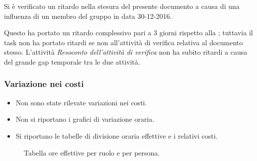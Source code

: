 Si è verificato un ritardo nella stesura del presente documento a causa di una influenza di un membro del gruppo in data 30-12-2016.

Questo ha portato un ritardo complessivo pari a 3 giorni rispetto alla ; tuttavia il task non ha portato ritardi se non all'attività di verifica relativa al documento stesso. L'attività \emph{Resoconto dell'attività di verifica} non ha subito ritardi a causa del grande gap temporale tra le due attività.

\pagebreak
\subsubsection{Variazione nei costi}
\begin{itemize}

\item Non sono state rilevate variazioni nei costi.

\item Non si riportano i grafici di variazione oraria.

\item Si riportano le tabelle di divisione oraria effettive e i relativi costi.

\end{itemize}
\begin{figure}[H]
\label{tab:car}
\caption{Tabella ore effettive {\AR} per ruolo e per persona.}

\end{figure}


